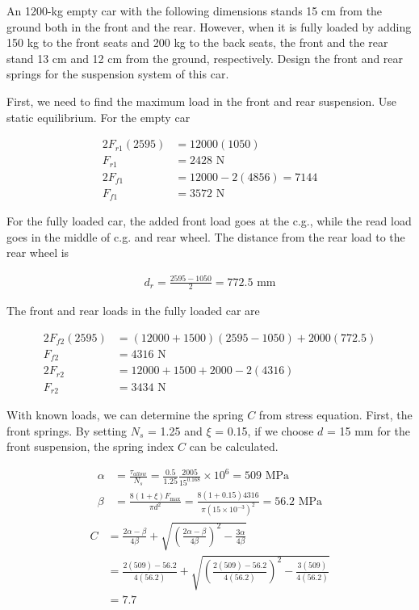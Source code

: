 \documentclass[
10pt,
a4paper,
openany,
svgnames,
]{book}
\begin{document}
\begin{example} An 1200-kg empty car with the following dimensions stands 15 cm from the ground both in the front and the rear. However, when it is fully loaded by adding 150 kg to the front seats and 200 kg to the back seats, the front and the rear stand 13 cm and 12 cm from the ground, respectively. Design the front and rear springs for the suspension system of this car. 
\end{example}
\begin{solution}
First, we need to find the maximum load in the front and rear suspension. Use static equilibrium. For the empty car

   \begin{align*}
     2F_{r1}(2595) &= 12000(1050) \\
     F_{r1} &= 2428 \text{ N} \\
     2F_{f1} &= 12000 - 2(4856) = 7144 \\
     F_{f1} &= 3572 \text{ N}
   \end{align*}

   For the fully loaded car, the added front load goes at the c.g., while the read load goes in the middle of c.g. and rear wheel. The distance from the rear load to the rear wheel is

   \begin{gather*}
     d_r = \frac{2595 - 1050}{2} = 772.5 \text{ mm}
   \end{gather*}

   The front and rear loads in the fully loaded car are

   \begin{align*}
     2F_{f2}(2595) &= (12000 + 1500)(2595 - 1050) + 2000(772.5) \\
     F_{f2} &= 4316 \text{ N} \\
     2F_{r2} &= 12000 + 1500 + 2000 - 2(4316) \\
     F_{r2} &= 3434 \text{ N}
   \end{align*}

   With known loads, we can determine the spring $C$ from stress equation. First, the front springs. By setting $N_s$ = 1.25 and $\xi$ = 0.15, if we choose $d$ = 15 mm for the front suspension, the spring index $C$ can be calculated.

   \begin{align*}
    \alpha &= \frac{\tau_{allow}}{N_s} = \frac{0.5}{1.25}\frac{2005}{15^{0.168}} \times 10^6 = 509 \text{ MPa} \\ 
    \beta &= \frac{8(1 + \xi)F_{\max}}{\pi d^2} = \frac{8(1 + 0.15)4316}{\pi (15 \times 10^{-3})^2} = 56.2 \text{ MPa}
  \end{align*}
  \begin{align*}
    C &= \frac{2\alpha  - \beta}{4\beta} + \sqrt {\left( \frac{2\alpha  - \beta}{4\beta} \right)^2 - \frac{3\alpha}{4\beta}}  \\ 
      & = \frac{2(509) - 56.2}{4(56.2)} + \sqrt {\left( \frac{2(509) - 56.2}{4(56.2)} \right)^2 - \frac{3(509)}{4(56.2)}}  \\ 
      &= 7.7 
  \end{align*}


\end{solution}
\end{document}
